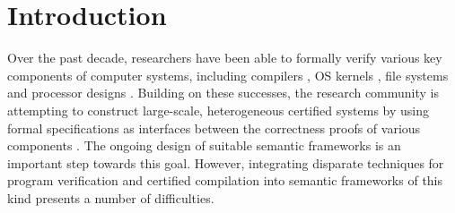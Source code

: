 \section{Introduction}
\label{sec:intro}

Over the past decade, researchers have been able to formally verify
various key components of computer systems, including compilers
\cite{compcert,cakeml,vellvm}, OS kernels \cite{klein2009sel4,dscal15,certikos-osdi16},
file systems \cite{fscq} and processor designs \cite{safe,kami}.
Building on these successes, the research community is attempting to
construct large-scale, heterogeneous certified systems by using formal
specifications as interfaces between the correctness proofs of various
components \cite{deepspec}.  The ongoing design of suitable semantic
frameworks is an important step towards this goal.  However,
integrating disparate techniques for
program verification and
certified compilation
into semantic frameworks of this kind
presents a number of difficulties.

%
%
%


